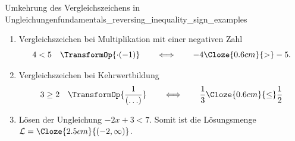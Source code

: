 \begin{ExampleBox}{Umkehrung des Vergleichszeichens in Ungleichungen}{fundamentals_reversing_inequality_sign_examples}
    \begin{enumerate}[label=\alph*)]
      \item Vergleichszeichen bei Multiplikation mit einer negativen Zahl
        \[
          \displaystyle 4<5 \quad\TransformOp{\cdot(-1)}
          \qquad \Longleftrightarrow \qquad
          -4\Cloze{0.6cm}{>}-5.
        \]
      \item Vergleichszeichen bei Kehrwertbildung
        \[
          3\geq2 \quad\TransformOp{\frac{1}{\left(\ldots\right)}}
          \qquad \Longleftrightarrow \qquad
          \frac{1}{3}\Cloze{0.6cm}{\leq}\frac{1}{2}
        \]

      \item Lösen der Ungleichung $-2x+3<7$.
        Somit ist die Lösungsmenge
        $\mathcal{L}=\Cloze{2.5cm}{(-2,\infty)}$.
    \end{enumerate}
\end{ExampleBox}
